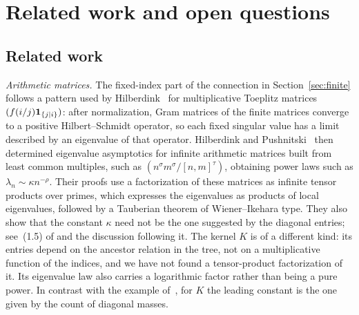 \section{Related work and open questions}\label{sec:related}
\subsection{Related work}
\emph{Arithmetic matrices.} The fixed-index part of the connection in
Section~\ref{sec:finite} follows a pattern used by Hilberdink~\cite{Hil17}
for multiplicative Toeplitz matrices $(f(i/j)\mathbf 1_{\{j\mid i\}})$: after
normalization, Gram matrices of the finite matrices converge to a positive
Hilbert--Schmidt operator, so each fixed singular value has a limit
described by an eigenvalue of that operator. Hilberdink and
Pushnitski~\cite{HP21,HP24} then determined eigenvalue asymptotics for
infinite arithmetic matrices built from least common multiples, such as
$(n^\sigma m^\sigma/[n,m]^\tau)$, obtaining power laws such as
$\lambda_n\sim\kappa n^{-\rho}$. Their proofs use a factorization of these
matrices as infinite tensor products over primes, which expresses the
eigenvalues as products of local eigenvalues, followed by a Tauberian
theorem of Wiener--Ikehara type. They also show that the constant $\kappa$
need not be the one suggested by the diagonal entries; see~(1.5) of
\cite{HP21} and the discussion following it. The kernel $K$ is of a
different kind: its entries depend
on the ancestor relation in the tree, not on a multiplicative function of
the indices, and we have not found a tensor-product factorization of it.
Its eigenvalue law also carries a logarithmic factor rather than being a
pure power. In contrast with the example of~\cite{HP21}, for $K$ the
leading constant is the one given by the count of diagonal masses.

